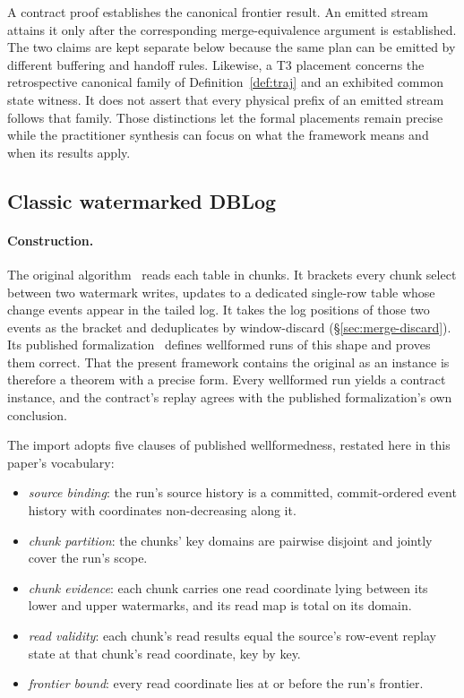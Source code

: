 \documentclass[sigconf,nonacm,10pt]{acmart}
\theoremstyle{plain}
\theoremstyle{definition}
\begin{document}
A contract proof establishes the canonical frontier result. An emitted
stream attains it only after the corresponding merge-equivalence
argument is established. The two claims are kept separate below because
the same plan can be emitted by different buffering and handoff rules.
Likewise, a T3 placement concerns the retrospective canonical family
of Definition~\ref{def:traj} and an exhibited common state witness. It
does not assert that every physical
prefix of an emitted stream follows that family. Those distinctions let
the formal placements remain precise while the practitioner synthesis
can focus on what the framework means and when its results apply.

\subsection{Classic watermarked DBLog}\label{sec:inst-classic}

\paragraph{Construction.}
The original algorithm~\cite{andreakis2020dblog} reads each table
in chunks. It brackets every chunk select between two watermark
writes, updates to a dedicated single-row table whose change events
appear in the tailed log. It takes the log positions of those two
events as the bracket and deduplicates by window-discard
(\S\ref{sec:merge-discard}). Its published
formalization~\cite{andreakis2026virtualcuts} defines wellformed
runs of this shape and proves them correct. That the present framework 
contains the original as an instance is therefore a theorem with 
a precise form. Every wellformed run yields a contract instance, 
and the contract's replay agrees with the published formalization's 
own conclusion.

The import adopts five clauses of published wellformedness,
restated here in this paper's vocabulary:

\begin{itemize}
\item \emph{source binding}: the run's source history is a
committed, commit-ordered event history with coordinates
non-decreasing along it.
\item \emph{chunk partition}: the chunks' key domains are pairwise
disjoint and jointly cover the run's scope.
\item \emph{chunk evidence}: each chunk carries one read
coordinate lying between its lower and upper watermarks, and its
read map is total on its domain.
\item \emph{read validity}: each chunk's read results equal the source's
row-event replay state at that chunk's read coordinate, key by key.
\item \emph{frontier bound}: every read coordinate lies at or
before the run's frontier.
\end{itemize}
\end{document}
